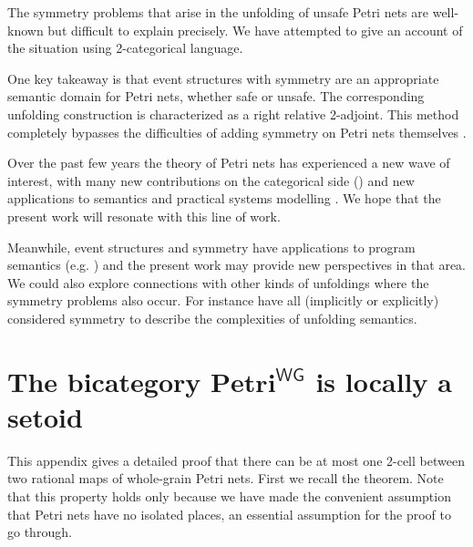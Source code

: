 \documentclass[11pt,a4paper]{article}
\theoremstyle{plain}
\theoremstyle{definition}
\theoremstyle{remark}
\newcommand{\WGPetri}{\mathbf{Petri}^{\mathsf{WG}}}
\begin{document}
The symmetry problems that arise in the unfolding of unsafe Petri nets are well-known but difficult to explain precisely. We have attempted to give an account of the situation using 2-categorical language.

One key takeaway is that event structures with symmetry are an appropriate semantic domain for Petri nets, whether safe or unsafe. The corresponding unfolding construction is characterized as a right relative 2-adjoint. This method completely bypasses the difficulties of adding symmetry on Petri nets themselves \cite{GENUN}.


Over the past few years the theory of Petri nets has experienced a new wave of interest, with many new contributions on the categorical side 
(\cite{baez2021categories,baez2020open,bumpus2025additive,master2025colored, ACFPN}) and new applications to semantics \cite{di2025dialectica,castellan2023geometry} and practical systems modelling \cite{dalrymple2024safeguarded,catcolab}. We hope that the present work will resonate with this line of work. 

Meanwhile, event structures and symmetry have applications to program semantics (e.g. \cite{GSES,castellan2015parallel}) and the present work may provide new perspectives in that area. We could also explore connections with other kinds of unfoldings where the symmetry problems also occur. For instance \cite{ESES, SIC, GCMC} have all (implicitly or  explicitly) considered symmetry to describe the complexities of unfolding semantics. 

 



\appendix
\section{The bicategory $\WGPetri$ is locally a setoid}
\label{sec:discreteness-proof}

This appendix gives a detailed proof that there can be at most one 2-cell between two rational maps of whole-grain Petri nets. First we recall the theorem. Note that this property holds only because we have made the convenient assumption that Petri nets have no isolated places, an essential assumption for the proof to go through.  

\discreteness*
\end{document}
